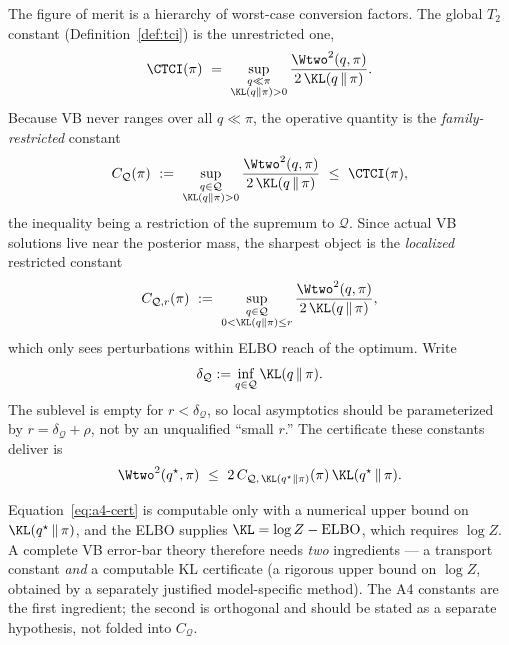 \documentclass[../../main.tex]{subfiles}
\begin{document}
The figure of merit is a hierarchy of worst-case conversion factors. The global $T_2$ constant
(Definition~\ref{def:tci}) is the unrestricted one,
\begin{equation}\label{eq:a4-ctci}
  \CTCI(\pi)\ =\ \sup_{\substack{q\ll\pi\\ \KL(q\|\pi)>0}}\frac{\Wtwo^2(q,\pi)}{2\,\KL(q\,\|\,\pi)} .
\end{equation}
Because VB never ranges over all $q\ll\pi$, the operative quantity is the
\emph{family-restricted} constant
\begin{equation}\label{eq:a4-cq}
  C_{\mathcal Q}(\pi)\ :=\ \sup_{\substack{q\in\mathcal Q\\ \KL(q\|\pi)>0}}
  \frac{\Wtwo^2(q,\pi)}{2\,\KL(q\,\|\,\pi)}
  \ \le\ \CTCI(\pi),
\end{equation}
the inequality being a restriction of the supremum to $\mathcal Q$. Since actual VB solutions
live near the posterior mass, the sharpest object is the \emph{localized} restricted constant
\begin{equation}\label{eq:a4-cqr}
  C_{\mathcal Q,r}(\pi)\ :=\ \sup_{\substack{q\in\mathcal Q\\ 0<\KL(q\|\pi)\le r}}
  \frac{\Wtwo^2(q,\pi)}{2\,\KL(q\,\|\,\pi)} ,
\end{equation}
which only sees perturbations within ELBO reach of the optimum. Write
\begin{equation}\label{eq:a4-gap}
  \delta_{\mathcal Q}:=\inf_{q\in\mathcal Q}\KL(q\,\|\,\pi).
\end{equation}
The sublevel is empty for $r<\delta_{\mathcal Q}$, so local asymptotics should be parameterized by
$r=\delta_{\mathcal Q}+\rho$, not by an unqualified ``small $r$.'' The certificate these constants
deliver is
\begin{equation}\label{eq:a4-cert}
  \Wtwo^2(q^\star,\pi)\ \le\ 2\,C_{\mathcal Q,\,\KL(q^\star\|\pi)}(\pi)\,\KL(q^\star\,\|\,\pi).
\end{equation}

\begin{remark}
\label{rem:a4-elbo}
Equation~\eqref{eq:a4-cert} is computable only with a numerical upper bound on
$\KL(q^\star\,\|\,\pi)$, and the ELBO supplies $\KL=\log Z-\mathrm{ELBO}$, which requires
$\log Z$. A complete VB error-bar theory therefore needs \emph{two} ingredients --- a transport
constant \emph{and} a computable KL certificate (a rigorous upper bound on $\log Z$, obtained by
a separately justified model-specific method). The A4 constants are the first ingredient; the second is
orthogonal and should be stated as a separate hypothesis, not folded into $C_{\mathcal Q}$.
\end{remark}
\end{document}
